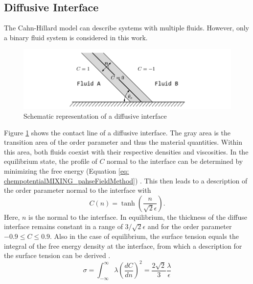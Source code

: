 \subsection{Diffusive Interface}
\label{sec: DiffusiveInterface}
The Cahn-Hillard model can describe systems with multiple fluids. However, only a binary fluid system is considered in this work.
\begin{figure}[h]
    \centering
    \includegraphics[width=.95\textwidth]{Pictures/DiffusiveInterface.pdf}
    \caption{Schematic representation of a diffusive interface}
    \label{fig: DiffusiveInteraface}
\end{figure}
Figure \ref{fig: DiffusiveInteraface} shows the contact line of a diffusive interface. The gray area is the transition area of the order parameter and thus the material quantities. Within this area, both fluids coexist with their respective densities and viscosities. In the equilibrium state, the profile of $C$ normal to the interface can be determined by minimizing the free energy (Equation \ref{eq: chempotentialMIXING_pahseFieldMethod}) \cite{cai2015NumericalSimulationWetting}. This then leads to a description of the order parameter normal to the interface with
\begin{equation}
    \label{eq: InterfactialNormalDirProfile}
    C(n) = \tanh\left(\frac{n}{\sqrt{2}\epsilon}\right).
\end{equation}
Here, $n$ is the normal to the interface. In equilibrium, the thickness of the diffuse interface remains constant in a range of $3/\sqrt{2}\epsilon$ and for the order parameter $-0.9\leq C\leq0.9$. Also in the case of equilibrium, the surface tension equals the integral of the free energy density at the interface, from which a description for the surface tension can be derived \cite{jacqmin2000ContactlineDynamicsDiffuse}.
\begin{equation}
\label{eq: surfacetensionEqui}
    \sigma = \int_{-\infty}^{\infty}\lambda\left( \frac{dC}{dn}  \right)^{2}= \frac{2\sqrt{2}}{3} \frac{\lambda}{\epsilon}
\end{equation}

